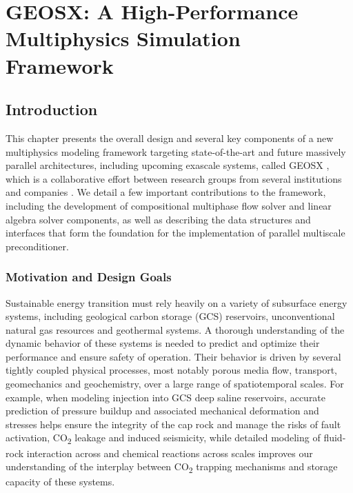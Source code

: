 \chapter{GEOSX: A High-Performance Multiphysics Simulation Framework}
\label{ch:geosx_framework}

\section{Introduction}
\label{sec:geosx_intro}

This chapter presents the overall design and several key components of a new multiphysics modeling framework targeting state-of-the-art and future massively parallel architectures, including upcoming exascale systems, called GEOSX \cite{geosx}, which is a collaborative effort between research groups from several institutions and companies \cite{geosx-website}.   We detail a few important contributions to the framework, including the development of compositional multiphase flow solver and linear algebra solver components, as well as describing the data structures and interfaces that form the foundation for the implementation of parallel multiscale preconditioner.

\subsection{Motivation and Design Goals}
\label{subsec:geosx_motivation}

Sustainable energy transition must rely heavily on a variety of subsurface energy systems, including  geological carbon storage (GCS) reservoirs, unconventional natural gas resources and geothermal systems.   A thorough understanding of the dynamic behavior of these systems is needed to predict and optimize their performance and ensure safety of operation.   Their behavior is driven by several tightly coupled physical processes, most notably porous media flow, transport, geomechanics and geochemistry, over a large range of spatiotemporal scales.   For example, when modeling injection into GCS deep saline reservoirs, accurate prediction of pressure buildup and associated mechanical deformation and stresses helps ensure the integrity of the cap rock and manage the risks of fault activation, CO\textsubscript{2} leakage and induced seismicity, while detailed modeling of fluid-rock interaction across and chemical reactions across scales improves our understanding of the interplay between CO\textsubscript{2} trapping mechanisms and storage capacity of these systems.

